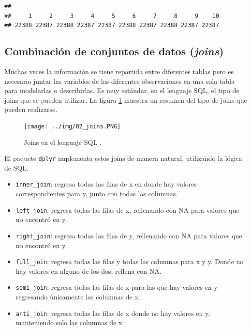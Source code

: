 \documentclass[]{article}
\newenvironment{Shaded}{\begin{snugshade}}{\end{snugshade}}
\newcommand{\KeywordTok}[1]{\textcolor[rgb]{0.13,0.29,0.53}{\textbf{#1}}}
\newcommand{\DecValTok}[1]{\textcolor[rgb]{0.00,0.00,0.81}{#1}}
\newcommand{\StringTok}[1]{\textcolor[rgb]{0.31,0.60,0.02}{#1}}
\newcommand{\OperatorTok}[1]{\textcolor[rgb]{0.81,0.36,0.00}{\textbf{#1}}}
\newcommand{\NormalTok}[1]{#1}
\providecommand{\tightlist}{%
  \setlength{\itemsep}{0pt}\setlength{\parskip}{0pt}}
\begin{document}
\begin{Shaded}
\end{Shaded}

\begin{verbatim}
## 
##     1     2     3     4     5     6     7     8     9    10 
## 22388 22387 22388 22387 22387 22388 22387 22388 22387 22387
\end{verbatim}

\subsection{\texorpdfstring{Combinación de conjuntos de datos
(\emph{joins})}{Combinación de conjuntos de datos (joins)}}\label{combinacion-de-conjuntos-de-datos-joins}

Muchas veces la información se tiene repartida entre diferentes tablas
pero es necesario juntar las variables de las diferentes observaciones
en una sola tabla para modelarlas o describirlas. Es muy estándar, en el
lenguaje SQL, el tipo de joins que se pueden utilizar. La figura
\ref{fig:joins} muestra un resumen del tipo de joins que pueden
realizarse.

\begin{figure}[h]
    \centering
    \texttt{[image: ../img/02\_joins.PNG]}
    \caption{Joins en el lenguaje SQL \parencite{joins}.}
    \label{fig:joins}
\end{figure}

El paquete \texttt{dplyr} implementa estos joins de manera natural,
utilizando la lógica de SQL.

\begin{itemize}
\tightlist
\item
  \texttt{inner\_join}: regresa todas las filas de x en donde hay
  valores correspondientes para y, junto con todas las columnas.
\item
  \texttt{left\_join}: regresa todas las filas de x, rellenando con NA
  para valores que no encontró en y.
\item
  \texttt{right\_join}: regresa todas las filas de y, rellenando con NA
  para valores que no encontró en y.
\item
  \texttt{full\_join}: regresa todas las filas y todas las columnas para
  x y y. Donde no hay valores en alguno de los dos, rellena con NA.
\item
  \texttt{semi\_join}: regresa todas las filas de x para las que hay
  valores en y regresando únicamente las columnas de x.
\item
  \texttt{anti\_join}: regresa todas las filas de x donde no hay valores
  en y, manteniendo solo las columnas de x.
\end{itemize}
\end{document}
